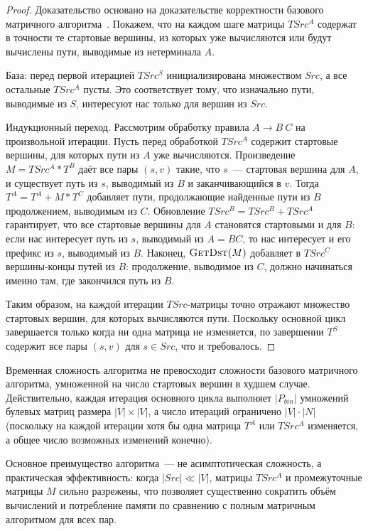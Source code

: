 \begin{proof}
    Доказательство основано на доказательстве корректности базового матричного алгоритма~.
    Покажем, что на каждом шаге матрицы $TSrc^A$ содержат в точности те стартовые вершины, из которых уже вычисляются или будут вычислены пути, выводимые из нетерминала $A$.

    База: перед первой итерацией $TSrc^S$ инициализирована множеством $\mathit{Src}$, а все остальные $TSrc^A$ пусты.
    Это соответствует тому, что изначально пути, выводимые из $S$, интересуют нас только для вершин из $\mathit{Src}$.

    Индукционный переход. Рассмотрим обработку правила $A \to B\ C$ на произвольной итерации.
    Пусть перед обработкой $TSrc^A$ содержит стартовые вершины, для которых пути из $A$ уже вычисляются.
    Произведение $M = TSrc^A * T^B$ даёт все пары $(s, v)$ такие, что $s$~--- стартовая вершина для $A$, и существует путь из $s$, выводимый из $B$ и заканчивающийся в $v$.
    Тогда $T^A = T^A + M * T^C$ добавляет пути, продолжающие найденные пути из $B$ продолжением, выводимым из $C$.
    Обновление $TSrc^B = TSrc^B + TSrc^A$ гарантирует, что все стартовые вершины для $A$ становятся стартовыми и для $B$: если нас интересует путь из $s$, выводимый из $A = BC$, то нас интересует и его префикс из $s$, выводимый из $B$.
    Наконец, $\textsc{GetDst}(M)$ добавляет в $TSrc^C$ вершины-концы путей из $B$: продолжение, выводимое из $C$, должно начинаться именно там, где закончился путь из $B$.

    Таким образом, на каждой итерации $TSrc$-матрицы точно отражают множество стартовых вершин, для которых вычисляются пути.
    Поскольку основной цикл завершается только когда ни одна матрица не изменяется, по завершении $T^S$ содержит все пары $(s,v)$ для $s \in \mathit{Src}$, что и требовалось.
\end{proof}

Временная сложность алгоритма не превосходит сложности базового матричного алгоритма, умноженной на число стартовых вершин в худшем случае.
Действительно, каждая итерация основного цикла выполняет $|P_{\mathit{bin}}|$ умножений булевых матриц размера $|V| \times |V|$, а число итераций ограничено $|V| \cdot |N|$ (поскольку на каждой итерации хотя бы одна матрица $T^A$ или $TSrc^A$ изменяется, а общее число возможных изменений конечно).

Основное преимущество алгоритма~--- не асимптотическая сложность, а практическая эффективность: когда $|\mathit{Src}| \ll |V|$, матрицы $TSrc^A$ и промежуточные матрицы $M$ сильно разрежены, что позволяет существенно сократить объём вычислений и потребление памяти по сравнению с полным матричным алгоритмом для всех пар.
